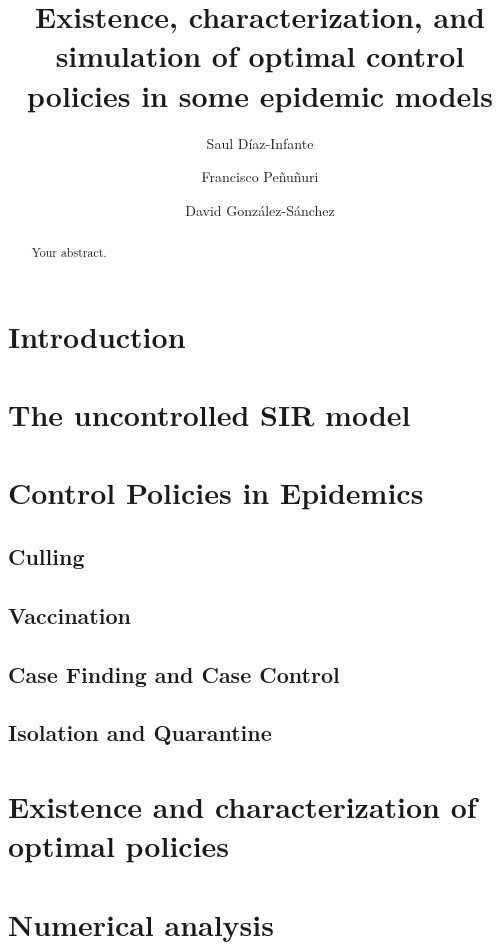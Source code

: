 \documentclass[titlepage]{amsart}
\title[%
	Existence, characterization and simulation of OCP for a family of epidemic 
	Models%
	]{
	Existence, characterization, and simulation
	of optimal control policies in some epidemic models
}
\author[S. D\'iaz-Infante]{Saul D\'iaz-Infante}
\author[F. Pe\~nu\~nuri]{Francisco Pe\~nu\~nuri}
\author[D. Gonz\'alez-S\'anchez]{David Gonz\'alez-S\'anchez}
\begin{document}
	\maketitle
  \begin{abstract}
  	Your abstract.
  \end{abstract}
%
%
  \section{Introduction}
    
  \section{The uncontrolled SIR model}
    
  \section{Control Policies in Epidemics}
    
        \subsection{Culling}
    
    \subsection{Vaccination}
      
    \subsection{Case Finding and Case Control}
      
    \subsection{Isolation and Quarantine}
      

  \section{Existence and characterization of optimal policies}
    
%
%
  \section{Numerical analysis}
    
\end{document}
